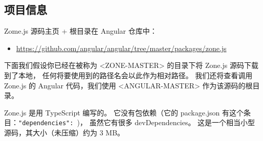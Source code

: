 \subsection{项目信息}


Zome.js 源码主页 + 根目录在 Angular 仓库中：

\begin{itemize}
  \item \url{https://github.com/angular/angular/tree/master/packages/zone.js}
\end{itemize}


下面我们假设你已经在被称为 <ZONE-MASTER> 的目录下将 Zone.js 源码下载到了本地，
任何将要使用到的路径名会以此作为相对路径。
我们还将查看调用 Zone.js 的 Angular 代码，我们使用
<ANGULAR-MASTER> 作为该源码的根目录。


Zone.js 是用 TypeScript 编写的。
它没有包依赖（它的 package.json 有这个条目：\texttt{"dependencies": {}})，
虽然它有很多 devDependencies。
这是一个相当小型源码，其大小（未压缩）约为 3 MB。
